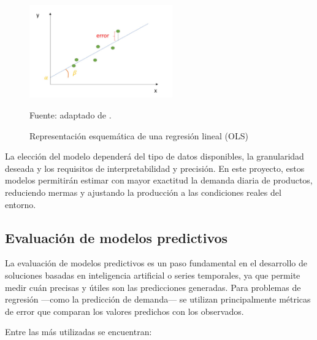 \begin{figure}[t]
    \centering
    \includegraphics[width=0.55\textwidth]{images/RegresionOLS.png}
    \caption{Representación esquemática de una regresión lineal (OLS)}
    \label{fig:ols}
    \vspace{2mm}
    \small Fuente: adaptado de \parencite{vitalflux2022ols}.
\end{figure}


La elección del modelo dependerá del tipo de datos disponibles, la granularidad deseada y los requisitos de interpretabilidad y precisión. En este proyecto, estos modelos permitirán estimar con mayor exactitud la demanda diaria de productos, reduciendo mermas y ajustando la producción a las condiciones reales del entorno.

\subsection{Evaluación de modelos predictivos}

La evaluación de modelos predictivos es un paso fundamental en el desarrollo de soluciones basadas en inteligencia artificial o series temporales, ya que permite medir cuán precisas y útiles son las predicciones generadas. Para problemas de regresión —como la predicción de demanda— se utilizan principalmente métricas de error que comparan los valores predichos con los observados.

Entre las más utilizadas se encuentran:

